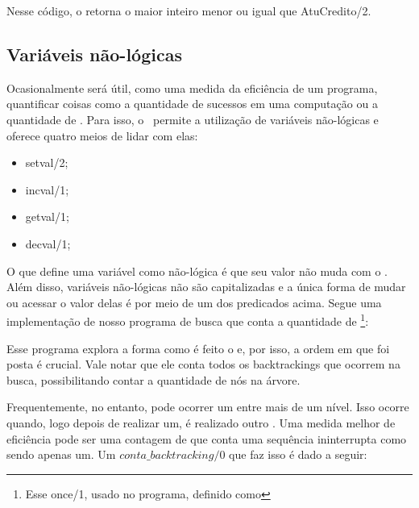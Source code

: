 \documentclass{article}
\begin{document}


Nesse código, o  retorna o maior inteiro menor ou igual que AtuCredito/2.

\subsection{Variáveis não-lógicas}

  Ocasionalmente será útil, como uma medida da eficiência de um programa, quantificar coisas como a quantidade de sucessos em uma computação ou a quantidade de . Para isso, o \eclipse\ permite a utilização de variáveis não-lógicas e oferece quatro meios de lidar com elas:

  \begin{itemize}
    \item setval/2;
    \item incval/1;
    \item getval/1;
    \item decval/1;
  \end{itemize}

  O que define uma variável como não-lógica é que seu valor não muda com o . Além disso, variáveis não-lógicas não são capitalizadas e a única forma de mudar ou acessar o valor delas é por meio de um dos predicados acima. Segue uma implementação de nosso programa de busca que conta a quantidade de \footnote{Esse once/1, usado no programa, definido como }:



Esse programa explora a forma como é feito o  e, por isso, a ordem em que foi posta é crucial. Vale notar que ele conta todos os backtrackings que ocorrem na busca, possibilitando contar a quantidade de nós na árvore.

Frequentemente, no entanto, pode ocorrer um  entre mais de um nível. Isso ocorre quando, logo depois de realizar um, é realizado outro . Uma medida melhor de eficiência pode ser uma contagem de  que conta uma sequência ininterrupta como sendo apenas um. Um $conta\_backtracking/0$ que faz isso é dado a seguir:


\end{document}
